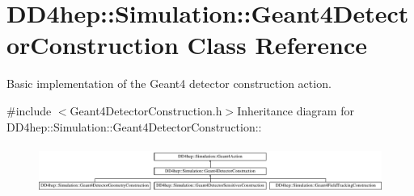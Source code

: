 \hypertarget{class_d_d4hep_1_1_simulation_1_1_geant4_detector_construction}{
\section{DD4hep::Simulation::Geant4DetectorConstruction Class Reference}
\label{class_d_d4hep_1_1_simulation_1_1_geant4_detector_construction}
}


Basic implementation of the Geant4 detector construction action.  


{\ttfamily \#include $<$Geant4DetectorConstruction.h$>$}Inheritance diagram for DD4hep::Simulation::Geant4DetectorConstruction::\begin{figure}[H]
\begin{center}
\leavevmode
\includegraphics[height=1.59544cm]{class_d_d4hep_1_1_simulation_1_1_geant4_detector_construction}
\end{center}
\end{figure}
